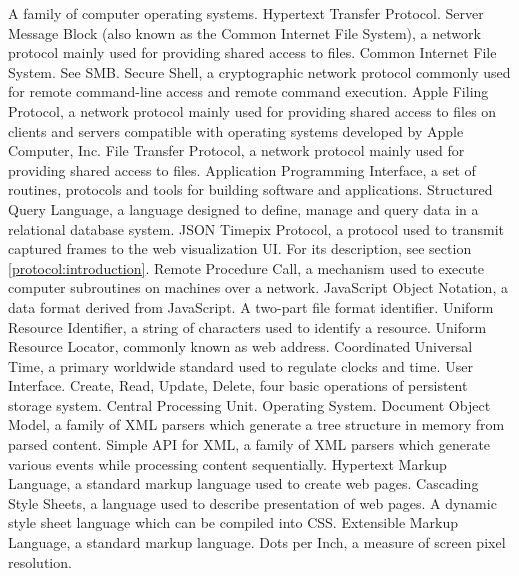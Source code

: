 		{A family of computer operating systems.}
		{Hypertext Transfer Protocol.}
		{Server Message Block (also known as the Common Internet File System), a network protocol mainly used for providing shared access to files.}
		{Common Internet File System. See SMB.}
		{Secure Shell, a cryptographic network protocol commonly used for remote command-line access and remote command execution.}
		{Apple Filing Protocol, a network protocol mainly used for providing shared access to files on clients and servers compatible with operating systems developed by Apple Computer, Inc.}
		{File Transfer Protocol, a network protocol mainly used for providing shared access to files.}
		{Application Programming Interface, a set of routines, protocols and tools for building software and applications.}
		{Structured Query Language, a language designed to define, manage and query data in a relational database system.}
		{JSON Timepix Protocol, a protocol used to transmit captured frames to the web visualization UI. For its description, see section \ref{protocol:introduction}.}
		{Remote Procedure Call, a mechanism used to execute computer subroutines on machines over a network.}
		{JavaScript Object Notation, a data format derived from JavaScript.}
		{A two-part file format identifier.}
		{Uniform Resource Identifier, a string of characters used to identify a resource.}
		{Uniform Resource Locator, commonly known as web address.}
		{Coordinated Universal Time, a primary worldwide standard used to regulate clocks and time.}
		{User Interface.}
		{Create, Read, Update, Delete, four basic operations of persistent storage system.}
		{Central Processing Unit.}
		{Operating System.}
		{Document Object Model, a family of XML parsers which generate a tree structure in memory from parsed content.}
		{Simple API for XML, a family of XML parsers which generate various events while processing content sequentially.}
		{Hypertext Markup Language, a standard markup language used to create web pages. \cite{HtmlStandard}}
		{Cascading Style Sheets, a language used to describe presentation of web pages.}
		{A dynamic style sheet language which can be compiled into CSS.}
		{Extensible Markup Language, a standard markup language.}
		{Dots per Inch, a measure of screen pixel resolution.}


